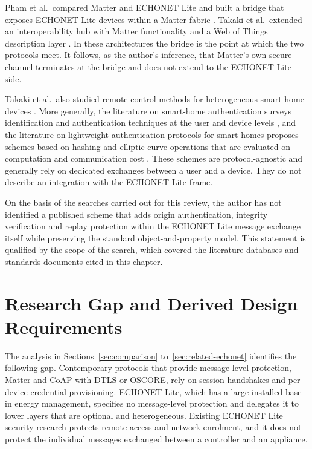 Pham et al.\ compared Matter and ECHONET Lite and built a bridge that exposes ECHONET Lite devices within a Matter fabric \cite{phamMatterECHONETLite2024}. Takaki et al.\ extended an interoperability hub with Matter functionality and a Web of Things description layer \cite{Takaki2026}. In these architectures the bridge is the point at which the two protocols meet. It follows, as the author's inference, that Matter's own secure channel terminates at the bridge and does not extend to the ECHONET Lite side.

Takaki et al.\ also studied remote-control methods for heterogeneous smart-home devices \cite{takakiStudyRemoteControl2024}. More generally, the literature on smart-home authentication surveys identification and authentication techniques at the user and device levels \cite{AlJanah2021}, and the literature on lightweight authentication protocols for smart homes proposes schemes based on hashing and elliptic-curve operations that are evaluated on computation and communication cost \cite{Nyangaresi2022,Oh2021}. These schemes are protocol-agnostic and generally rely on dedicated exchanges between a user and a device. They do not describe an integration with the ECHONET Lite frame.

On the basis of the searches carried out for this review, the author has not identified a published scheme that adds origin authentication, integrity verification and replay protection within the ECHONET Lite message exchange itself while preserving the standard object-and-property model. This statement is qualified by the scope of the search, which covered the literature databases and standards documents cited in this chapter.

\section{Research Gap and Derived Design Requirements}
\label{sec:gap}

The analysis in Sections~\ref{sec:comparison} to~\ref{sec:related-echonet} identifies the following gap. Contemporary protocols that provide message-level protection, Matter and CoAP with DTLS or OSCORE, rely on session handshakes and per-device credential provisioning. ECHONET Lite, which has a large installed base in energy management, specifies no message-level protection and delegates it to lower layers that are optional and heterogeneous. Existing ECHONET Lite security research protects remote access and network enrolment, and it does not protect the individual messages exchanged between a controller and an appliance.


